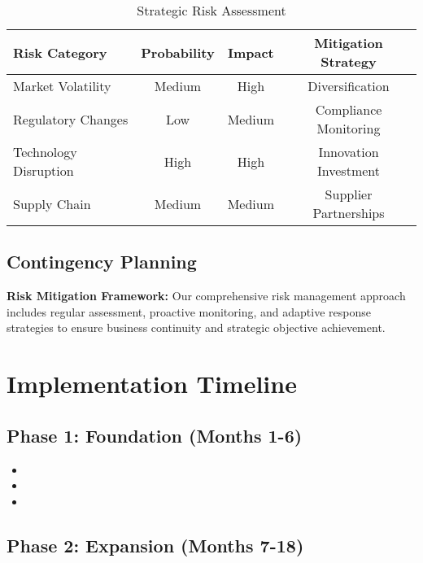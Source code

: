 \documentclass[11pt,a4paper]{article}
\begin{document}
\begin{table}[h]
\centering
\begin{tabular}{@{}lccc@{}}
\toprule
\textbf{Risk Category} & \textbf{Probability} & \textbf{Impact} & \textbf{Mitigation Strategy} \\
\midrule
Market Volatility & Medium & High & Diversification \\
Regulatory Changes & Low & Medium & Compliance Monitoring \\
Technology Disruption & High & High & Innovation Investment \\
Supply Chain & Medium & Medium & Supplier Partnerships \\
\bottomrule
\end{tabular}
\caption{Strategic Risk Assessment}
\end{table}

\subsection{Contingency Planning}

\lipsum[30-31]

\begin{keypoint}
\textbf{Risk Mitigation Framework:} Our comprehensive risk management approach includes regular assessment, proactive monitoring, and adaptive response strategies to ensure business continuity and strategic objective achievement.
\end{keypoint}

\section{Implementation Timeline}

\subsection{Phase 1: Foundation (Months 1-6)}

\begin{itemize}[leftmargin=*]
  \item \lipsum[32][1-2]
  \item \lipsum[33][1-2]
  \item \lipsum[34][1-2]
\end{itemize}

\subsection{Phase 2: Expansion (Months 7-18)}
\end{document}
